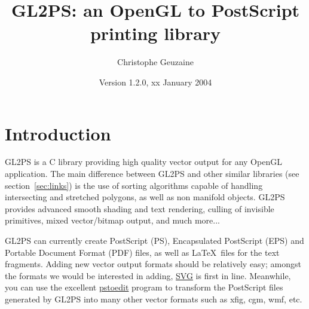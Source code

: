 \documentclass[10pt]{article}
\begin{document}
\title{GL2PS: an OpenGL to PostScript printing library}
\author{Christophe Geuzaine}
\date{Version 1.2.0, xx January 2004}

\maketitle


\tableofcontents

\section{Introduction}

GL2PS is a C library providing high quality vector output for any OpenGL
application. The main difference between GL2PS and other similar libraries
(see section~\ref{sec:links}) is the use of sorting algorithms capable of
handling intersecting and stretched polygons, as well as non manifold
objects. GL2PS provides advanced smooth shading and text rendering, culling
of invisible primitives, mixed vector/bitmap output, and much more...

GL2PS can currently create PostScript (PS), Encapsulated PostScript (EPS)
and Portable Document Format (PDF) files, as well as \LaTeX\ files for the
text fragments. Adding new vector output formats should be relatively easy;
amongst the formats we would be interested in adding,
\href{http://www.w3.org/Graphics/SVG/}{SVG} is first in line. Meanwhile, you
can use the excellent \href{http://www.pstoedit.net}{pstoedit} program to
transform the PostScript files generated by GL2PS into many other vector
formats such as xfig, cgm, wmf, etc.
\end{document}
